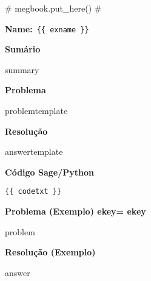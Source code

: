 {# megbook.put_here() #}

\textbf{Name:}~\verb+{{ exname }}+

\noindent\textbf{Sumário} 

{{ summary }}

\noindent\textbf{Problema} 

{{ problemtemplate }}

\noindent\textbf{Resolução}

{{ answertemplate }}

\noindent\textbf{Código Sage/Python}

\begin{verbatim}
{{ codetxt }}
\end{verbatim}

\noindent\textbf{Problema (Exemplo) ekey= {{ ekey }} }

{{ problem }}

\noindent\textbf{Resolução (Exemplo)}

{{ answer }}




